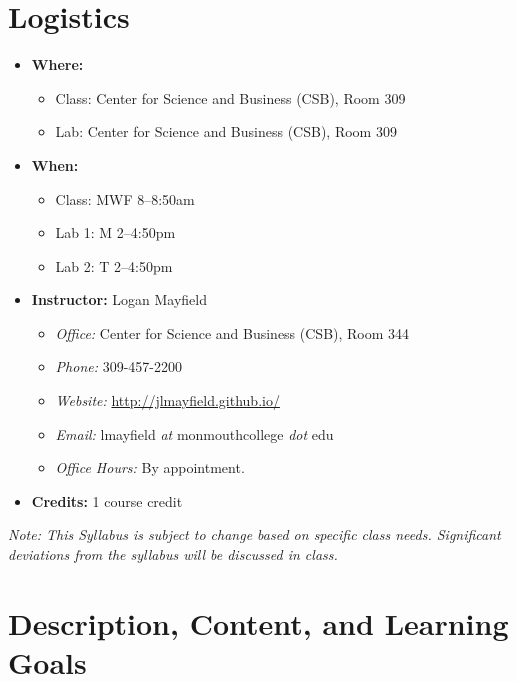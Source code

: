 \documentclass[10pt]{article}
\begin{document}
\section{Logistics}
\begin{itemize}
\item \textbf{Where: }
\begin{itemize}
\item Class: Center for Science and Business (CSB), Room 309\footnotemark[1]
\item Lab: Center for Science and Business (CSB), Room 309\footnotemark[1]
\end{itemize}
\item \textbf{When: }
\begin{itemize}
  \item Class: MWF 8--8:50am
  \item Lab 1: M 2--4:50pm
  \item Lab 2: T 2--4:50pm
\end{itemize}
\item \textbf{Instructor: } Logan Mayfield
\begin{itemize}
\item \textit{Office: } Center for Science and Business (CSB), Room 344\footnotemark[2]
\item \textit{Phone: } 309-457-2200 %
\item \textit{Website: } \url{http://jlmayfield.github.io/}
\item \textit{Email: } lmayfield \textit{at} monmouthcollege \textit{dot} edu
\item \textit{Office Hours: }  By appointment.
\end{itemize}
\item \textbf{Credits: } 1 course credit
\end{itemize}
\emph{Note: This Syllabus is subject to change based on specific class needs. Significant deviations from the syllabus will be discussed in class.}


\section{Description, Content, and Learning Goals}
\end{document}
